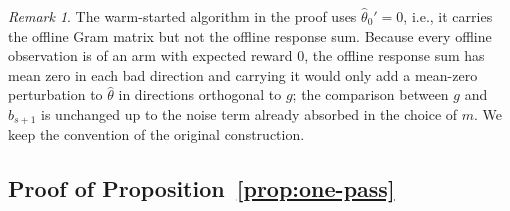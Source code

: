 \documentclass{article}
\theoremstyle{definition}
\theoremstyle{remark}
\newtheorem{remark}{Remark}
\theoremstyle{remark}
\begin{document}
\begin{remark}
The warm-started algorithm in the proof uses $\widehat\theta_0'=0$, i.e., it
carries the offline Gram matrix but not the offline response sum. Because
every offline observation is of an arm with expected reward $0$, the offline
response sum has mean zero in each bad direction and carrying it would only
add a mean-zero perturbation to $\widehat\theta$ in directions orthogonal to
$g$; the comparison between $g$ and $b_{s+1}$ is unchanged up to the noise
term already absorbed in the choice of $m$. We keep the convention of the
original construction.
\end{remark}

\subsection{Proof of Proposition~\ref{prop:one-pass}}
\label{app:proof-one-pass}
\end{document}
